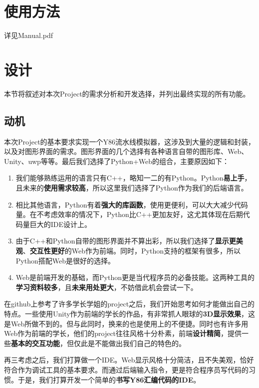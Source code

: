 \documentclass[12pt]{article} %
\begin{document}
\begin{sloppypar}
\section{使用方法}
详见Manual.pdf

\clearpage
\section{设计}

本节将叙述对本次Project的需求分析和开发选择，并列出最终实现的所有功能。

\subsection{动机}

本次Project的基本要求实现一个Y86流水线模拟器，这涉及到大量的逻辑和封装，以及对图形界面的需求。图形界面的几个选择有各种语言自带的图形库、Web、Unity、uwp等等。最后我们选择了Python+Web的组合，主要原因如下：

\begin{enumerate}
\item 我们能够熟练运用的语言只有C++，略知一二的有Python。Python{\bf 易上手}，且未来的{\bf 使用需求较高}，所以这里我们选择了Python作为我们的后端语言。

\item 相比其他语言，Python有着{\bf 强大的库函数}，使用更便利，可以大大减少代码量。在不考虑效率的情况下，Python比C++更加友好，这尤其体现在后期代码量巨大的IDE设计上。

\item 由于C++和Python自带的图形界面并不算出彩，所以我们选择了{\bf 显示更美观}、{\bf 交互性更好}的Web作为前端。同时，Python支持的框架有很多，所以Python搭配Web是很好的选择。

\item Web是前端开发的基础，而Python更是当代程序员的必备技能。这两种工具的{\bf 学习资料较多}，且{\bf 未来用处更大}，不妨借此机会尝试一下。
\end{enumerate}

在github上参考了许多学长学姐的project之后，我们开始思考如何才能做出自己的特点。一些使用Unity作为前端的学长的作品，有非常抓人眼球的{\bf 3D显示效果}，这是Web所做不到的。但与此同时，换来的也是使用上的不便捷。同时也有许多用Web作为前端的学长，他们的project往往风格十分朴素，前端{\bf 设计精简}，提供一些{\bf 基本的交互功能}，但仅此是不能做出我们自己的特色的。

再三考虑之后，我们打算做一个IDE。Web显示风格十分简洁，且不失美观，恰好符合作为调试工具的基本要求。而通过后端输入指令，更是符合程序员写代码的习惯。于是，我们打算开发一个简单的{\bf 书写Y86汇编代码的IDE}。


\end{sloppypar}
\end{document}
